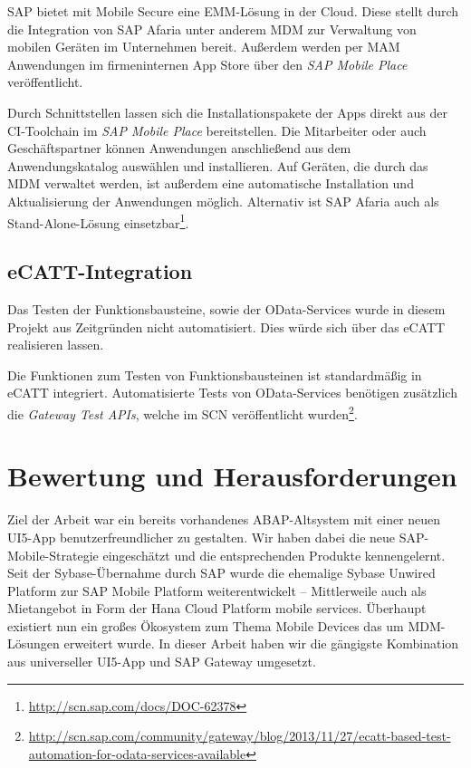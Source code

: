SAP bietet mit Mobile Secure eine \ac{EMM}-Lösung in der Cloud. Diese stellt durch die Integration von SAP Afaria unter anderem \ac{MDM} zur Verwaltung von mobilen Geräten im Unternehmen bereit. Außerdem werden per \ac{MAM} Anwendungen im firmeninternen App Store über den \textit{SAP Mobile Place} veröffentlicht. 

Durch Schnittstellen lassen sich die Installationspakete der Apps direkt aus der CI-Toolchain im \textit{SAP Mobile Place} bereitstellen. Die Mitarbeiter oder auch Geschäftspartner können Anwendungen anschließend aus dem Anwendungskatalog auswählen und installieren. Auf Geräten, die durch das \ac{MDM} verwaltet werden, ist außerdem eine automatische Installation und Aktualisierung der Anwendungen möglich. Alternativ ist SAP Afaria auch als Stand-Alone-Lösung einsetzbar\footnote{\url{http://scn.sap.com/docs/DOC-62378}}. 

\subsection{eCATT-Integration}
Das Testen der Funktionsbausteine, sowie der OData-Services wurde in diesem Projekt aus Zeitgründen nicht automatisiert. Dies würde sich über das \ac{eCATT} realisieren lassen. 

Die Funktionen zum Testen von Funktionsbausteinen ist standardmäßig in \ac{eCATT} integriert. Automatisierte Tests von OData-Services benötigen zusätzlich die \textit{Gateway Test APIs}, welche im SCN veröffentlicht wurden\footnote{\url{http://scn.sap.com/community/gateway/blog/2013/11/27/ecatt-based-test-automation-for-odata-services-available}}.

\section{Bewertung und Herausforderungen}
Ziel der Arbeit war ein bereits vorhandenes ABAP-Altsystem mit einer neuen UI5-App benutzerfreundlicher zu gestalten. Wir haben dabei die neue SAP-Mobile-Strategie eingeschätzt und die entsprechenden Produkte kennengelernt. Seit der Sybase-Übernahme durch SAP wurde die ehemalige Sybase Unwired Platform zur SAP Mobile Platform weiterentwickelt -- Mittlerweile auch als Mietangebot in Form der Hana Cloud Platform mobile services. Überhaupt existiert nun ein großes Ökosystem zum Thema Mobile Devices das \zB um MDM-Lösungen erweitert wurde. In dieser Arbeit haben wir die gängigste Kombination aus universeller UI5-App und SAP Gateway umgesetzt.

